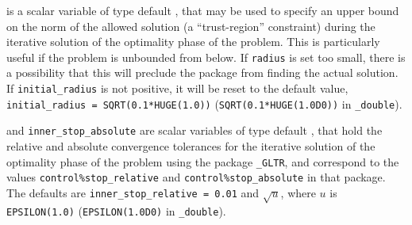 \begin{description}



 is a scalar variable of type default
\realdp, that may be used to specify an upper bound on the norm
of the allowed solution (a ``trust-region'' constraint) during the
iterative solution of the optimality phase of the problem.
This is particularly useful if the
problem is unbounded from below. If {\tt radius} is set too small, there
is a possibility that this will preclude the package from
finding the actual solution.
If {\tt initial\_radius} is not positive, it will be reset to the
default value, {\tt initial\_radius = SQRT(0.1*HUGE(1.0))}
({\tt SQRT(0.1*HUGE(1.0D0))} in {\tt \fullpackagename\_double}).


 and {\tt inner\_stop\_absolute}
are scalar variables of type default \realdp,
that hold the relative and absolute convergence tolerances for the
iterative solution of the optimality phase of the problem using the package
{\tt \libraryname\_GLTR},
and correspond to the values {\tt control\%stop\_relative} and
{\tt control\%stop\_absolute} in that package.
The defaults are
{\tt inner\_stop\_relative = 0.01}
and  $\sqrt{u}$,
where $u$ is {\tt EPSILON(1.0)} ({\tt EPSILON(1.0D0)} in
{\tt \fullpackagename\_double}).


\end{description}
